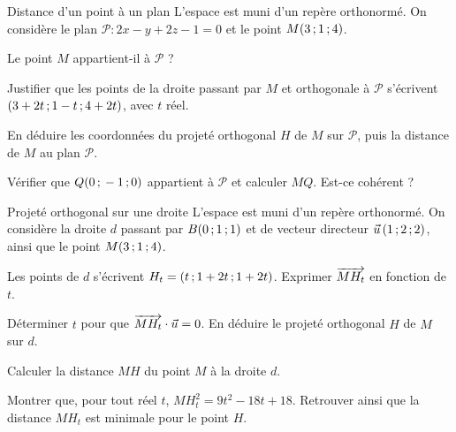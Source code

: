 \begin{exercice}[2]{Distance d'un point à un plan}
L'espace est muni d'un repère orthonormé. On considère le plan $\mathcal{P}:2x-y+2z-1=0$ et le point $M(3\,{;}\,1\,{;}\,4)$.
\begin{questions}
  \item Le point $M$ appartient-il à $\mathcal{P}$ ?
  \item Justifier que les points de la droite passant par $M$ et orthogonale à $\mathcal{P}$ s'écrivent $(3+2t\,{;}\,1-t\,{;}\,4+2t)$, avec $t$
    réel.
  \item En déduire les coordonnées du projeté orthogonal $H$ de $M$ sur $\mathcal{P}$, puis la distance de $M$ au plan $\mathcal{P}$.
  \item Vérifier que $Q(0\,{;}\,-1\,{;}\,0)$ appartient à $\mathcal{P}$ et calculer $MQ$. Est-ce cohérent ?
\end{questions}
\end{exercice}

\begin{exercice}[2]{Projeté orthogonal sur une droite}
L'espace est muni d'un repère orthonormé. On considère la droite $d$ passant par $B(0\,{;}\,1\,{;}\,1)$ et de vecteur directeur
$\vec u\,(1\,{;}\,2\,{;}\,2)$, ainsi que le point $M(3\,{;}\,1\,{;}\,4)$.
\begin{questions}
  \item Les points de $d$ s'écrivent $H_t=(t\,{;}\,1+2t\,{;}\,1+2t)$. Exprimer $\overrightarrow{MH_t}$ en fonction de $t$.
  \item Déterminer $t$ pour que $\overrightarrow{MH_t}\cdot\vec u=0$. En déduire le projeté orthogonal $H$ de $M$ sur $d$.
  \item Calculer la distance $MH$ du point $M$ à la droite $d$.
  \item Montrer que, pour tout réel $t$, $MH_t^2=9t^2-18t+18$. Retrouver ainsi que la distance $MH_t$ est minimale pour le point $H$.
\end{questions}
\end{exercice}

